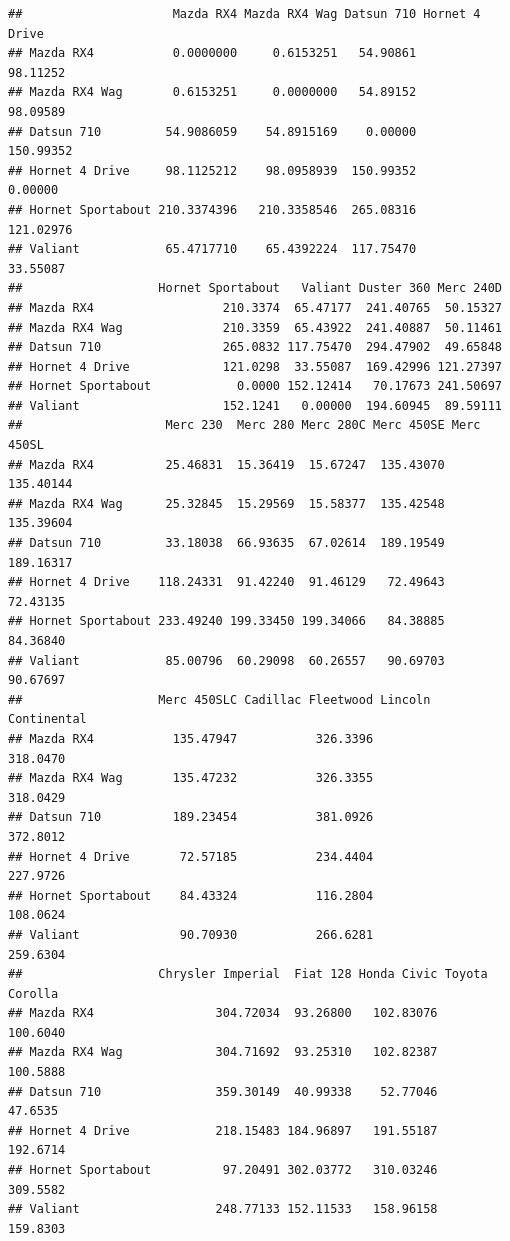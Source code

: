 \documentclass[]{book}
\begin{document}
\begin{verbatim}
##                     Mazda RX4 Mazda RX4 Wag Datsun 710 Hornet 4 Drive
## Mazda RX4           0.0000000     0.6153251   54.90861       98.11252
## Mazda RX4 Wag       0.6153251     0.0000000   54.89152       98.09589
## Datsun 710         54.9086059    54.8915169    0.00000      150.99352
## Hornet 4 Drive     98.1125212    98.0958939  150.99352        0.00000
## Hornet Sportabout 210.3374396   210.3358546  265.08316      121.02976
## Valiant            65.4717710    65.4392224  117.75470       33.55087
##                   Hornet Sportabout   Valiant Duster 360 Merc 240D
## Mazda RX4                  210.3374  65.47177  241.40765  50.15327
## Mazda RX4 Wag              210.3359  65.43922  241.40887  50.11461
## Datsun 710                 265.0832 117.75470  294.47902  49.65848
## Hornet 4 Drive             121.0298  33.55087  169.42996 121.27397
## Hornet Sportabout            0.0000 152.12414   70.17673 241.50697
## Valiant                    152.1241   0.00000  194.60945  89.59111
##                    Merc 230  Merc 280 Merc 280C Merc 450SE Merc 450SL
## Mazda RX4          25.46831  15.36419  15.67247  135.43070  135.40144
## Mazda RX4 Wag      25.32845  15.29569  15.58377  135.42548  135.39604
## Datsun 710         33.18038  66.93635  67.02614  189.19549  189.16317
## Hornet 4 Drive    118.24331  91.42240  91.46129   72.49643   72.43135
## Hornet Sportabout 233.49240 199.33450 199.34066   84.38885   84.36840
## Valiant            85.00796  60.29098  60.26557   90.69703   90.67697
##                   Merc 450SLC Cadillac Fleetwood Lincoln Continental
## Mazda RX4           135.47947           326.3396            318.0470
## Mazda RX4 Wag       135.47232           326.3355            318.0429
## Datsun 710          189.23454           381.0926            372.8012
## Hornet 4 Drive       72.57185           234.4404            227.9726
## Hornet Sportabout    84.43324           116.2804            108.0624
## Valiant              90.70930           266.6281            259.6304
##                   Chrysler Imperial  Fiat 128 Honda Civic Toyota Corolla
## Mazda RX4                 304.72034  93.26800   102.83076       100.6040
## Mazda RX4 Wag             304.71692  93.25310   102.82387       100.5888
## Datsun 710                359.30149  40.99338    52.77046        47.6535
## Hornet 4 Drive            218.15483 184.96897   191.55187       192.6714
## Hornet Sportabout          97.20491 302.03772   310.03246       309.5582
## Valiant                   248.77133 152.11533   158.96158       159.8303

\end{verbatim}
\end{document}
